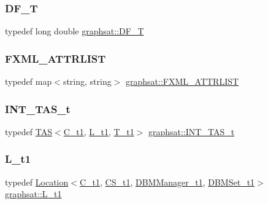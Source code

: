 \mbox{\label{namespacegraphsat_a9d75165dd4e82d2e03ffd07fe27533d0}} 
\subsubsection{\texorpdfstring{DF\_T}{DF\_T}}
{\footnotesize\ttfamily typedef long double \mbox{\hyperlink{namespacegraphsat_a9d75165dd4e82d2e03ffd07fe27533d0}{graphsat\+::\+D\+F\+\_\+T}}}

\mbox{\label{namespacegraphsat_ab40f1a7cacbf704e1869c944a7893ccc}} 
\subsubsection{\texorpdfstring{FXML\_ATTRLIST}{FXML\_ATTRLIST}}
{\footnotesize\ttfamily typedef map$<$string, string$>$ \mbox{\hyperlink{namespacegraphsat_ab40f1a7cacbf704e1869c944a7893ccc}{graphsat\+::\+F\+X\+M\+L\+\_\+\+A\+T\+T\+R\+L\+I\+ST}}}

\mbox{\label{namespacegraphsat_a72468138834e9a7182f32fed8035a2de}} 
\subsubsection{\texorpdfstring{INT\_TAS\_t}{INT\_TAS\_t}}
{\footnotesize\ttfamily typedef \mbox{\hyperlink{classgraphsat_1_1_t_a_s}{T\+AS}}$<$\mbox{\hyperlink{namespacegraphsat_af82e57b58a5af8441762469b70c475da}{C\+\_\+t1}}, \mbox{\hyperlink{namespacegraphsat_a73a6ad304c41491a8939153273e88398}{L\+\_\+t1}}, \mbox{\hyperlink{namespacegraphsat_af60e45e80e42bfeebed3cb349a68905f}{T\+\_\+t1}}$>$ \mbox{\hyperlink{namespacegraphsat_a72468138834e9a7182f32fed8035a2de}{graphsat\+::\+I\+N\+T\+\_\+\+T\+A\+S\+\_\+t}}}

\mbox{\label{namespacegraphsat_a73a6ad304c41491a8939153273e88398}} 
\subsubsection{\texorpdfstring{L\_t1}{L\_t1}}
{\footnotesize\ttfamily typedef \mbox{\hyperlink{classgraphsat_1_1_location}{Location}}$<$\mbox{\hyperlink{namespacegraphsat_af82e57b58a5af8441762469b70c475da}{C\+\_\+t1}}, \mbox{\hyperlink{namespacegraphsat_a6a55464bf94f0ab98539fd8c3b66c603}{C\+S\+\_\+t1}}, \mbox{\hyperlink{namespacegraphsat_abe6691ac6002381e0250076f52d17b09}{D\+B\+M\+Manager\+\_\+t1}}, \mbox{\hyperlink{namespacegraphsat_aef99081ea3cfd071bce1daf003acde8d}{D\+B\+M\+Set\+\_\+t1}}$>$ \mbox{\hyperlink{namespacegraphsat_a73a6ad304c41491a8939153273e88398}{graphsat\+::\+L\+\_\+t1}}}

